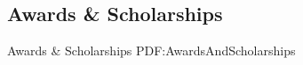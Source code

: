 \documentclass[letterpaper,MMMyyyy,nonstop]{simpleresumecv}
\begin{document}
\begin{body}








\section
{Awards \&\newline
Scholarships}
{Awards \& Scholarships}
{PDF:AwardsAndScholarships}


\end{body}
\end{document}
